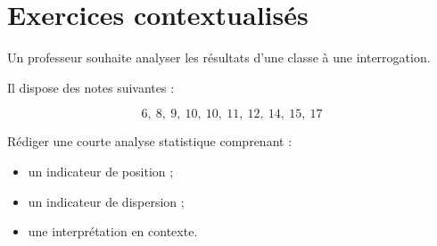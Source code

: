 \section{Exercices contextualisés}

\begin{cadreenonce}
Un professeur souhaite analyser les résultats d’une classe à une interrogation.

Il dispose des notes suivantes :

\[
6,\ 8,\ 9,\ 10,\ 10,\ 11,\ 12,\ 14,\ 15,\ 17
\]

Rédiger une courte analyse statistique comprenant :
\begin{itemize}
    \item un indicateur de position ;
    \item un indicateur de dispersion ;
    \item une interprétation en contexte.
\end{itemize}
\end{cadreenonce}